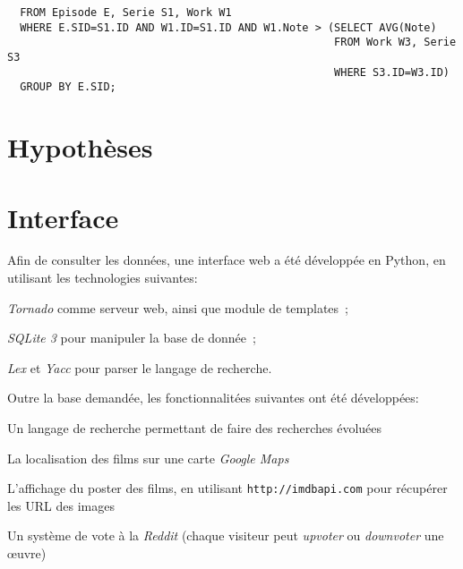 \documentclass[a4paper,12pt]{article}
\begin{document}
\begin{list}{-}{}
\begin{lstlisting}
  FROM Episode E, Serie S1, Work W1
  WHERE E.SID=S1.ID AND W1.ID=S1.ID AND W1.Note > (SELECT AVG(Note)
                                                   FROM Work W3, Serie S3
                                                   WHERE S3.ID=W3.ID)
  GROUP BY E.SID;
    \end{lstlisting}
\section{Hypothèses}
\section{Interface}
Afin de consulter les données, une interface web a été développée en
Python, en utilisant les technologies suivantes:
\begin{list}{-}{}
  \item \emph{Tornado} comme serveur web, ainsi que module de templates~;
  \item \emph{SQLite 3} pour manipuler la base de donnée~;
  \item \emph{Lex} et \emph{Yacc} pour parser le langage de recherche.
\end{list}

Outre la base demandée, les fonctionnalitées suivantes ont été développées:
\begin{list}{-}{}
  \item Un langage de recherche permettant de faire des recherches évoluées
  \item La localisation des films sur une carte \emph{Google Maps}
  \item L'affichage du poster des films, en utilisant
    \texttt{http://imdbapi.com} pour récupérer les URL des images
  \item Un système de vote à la \emph{Reddit} (chaque visiteur peut
    \emph{upvoter} ou \emph{downvoter} une œuvre)
\end{list}

\end{list}
\end{document}
